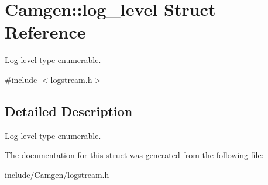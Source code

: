 \hypertarget{a00329}{}\section{Camgen\+:\+:log\+\_\+level Struct Reference}
\label{a00329}


Log level type enumerable.  




{\ttfamily \#include $<$logstream.\+h$>$}



\subsection{Detailed Description}
Log level type enumerable. 

The documentation for this struct was generated from the following file\+:\begin{DoxyCompactItemize}
\item 
include/\+Camgen/logstream.\+h\end{DoxyCompactItemize}
